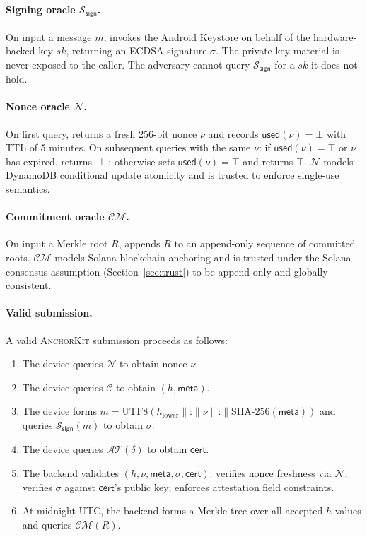 \documentclass[11pt,a4paper]{article}
\newcommand{\calC}{\mathcal{C}}
\newcommand{\calN}{\mathcal{N}}
\newcommand{\calAT}{\mathcal{AT}}
\newcommand{\calCM}{\mathcal{CM}}
\newcommand{\Ssign}{\mathcal{S}_{\mathsf{sign}}}
\newcommand{\sfmeta}{\mathsf{meta}}
\newcommand{\sfcert}{\mathsf{cert}}
\newcommand{\sfused}{\mathsf{used}}
\newcommand{\SHA}{\text{SHA-256}}
\newcommand{\AK}{\textsc{AnchorKit}\xspace}
\begin{document}
\paragraph{Signing oracle $\Ssign$.} On input a message $m$, invokes the
Android Keystore on behalf of the hardware-backed key $sk$, returning an ECDSA
signature $\sigma$.  The private key material is never exposed to the caller.
The adversary cannot query $\Ssign$ for a $sk$ it does not hold.

\paragraph{Nonce oracle $\calN$.} On first query, returns a fresh 256-bit
nonce $\nu$ and records $\sfused(\nu) = \bot$ with TTL of 5 minutes.  On
subsequent queries with the same $\nu$: if $\sfused(\nu) = \top$ or $\nu$ has
expired, returns $\perp$; otherwise sets $\sfused(\nu) = \top$ and returns
$\top$.  $\calN$ models DynamoDB conditional update atomicity and is trusted to
enforce single-use semantics.

\paragraph{Commitment oracle $\calCM$.} On input a Merkle root $R$, appends $R$
to an append-only sequence of committed roots.  $\calCM$ models Solana
blockchain anchoring and is trusted under the Solana consensus assumption
(Section~\ref{sec:trust}) to be append-only and globally consistent.

\paragraph{Valid submission.} A valid \AK submission proceeds as follows:
\begin{enumerate}[label=\arabic*.]
  \item The device queries $\calN$ to obtain nonce $\nu$.
  \item The device queries $\calC$ to obtain $(h, \sfmeta)$.
  \item The device forms
    $m = \mathrm{UTF8}(h_{\mathrm{lower}} \mathbin\| \texttt{:} \mathbin\| \nu
    \mathbin\| \texttt{:} \mathbin\| \SHA(\sfmeta))$
    and queries $\Ssign(m)$ to obtain $\sigma$.
  \item The device queries $\calAT(\delta)$ to obtain $\sfcert$.
  \item The backend validates $(h, \nu, \sfmeta, \sigma, \sfcert)$: verifies
    nonce freshness via $\calN$; verifies $\sigma$ against $\sfcert$'s public
    key; enforces attestation field constraints.
  \item At midnight UTC, the backend forms a Merkle tree over all accepted $h$
    values and queries $\calCM(R)$.
\end{enumerate}
\end{document}
